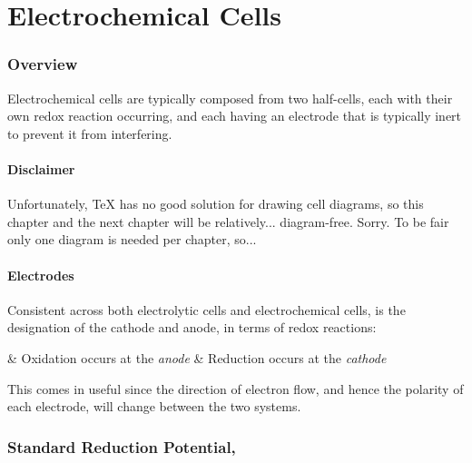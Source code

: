 

\pagebreak
\part{Electrochemical Cells}

	\section{Overview}

		Electrochemical cells are typically composed from two half-cells, each with their own redox reaction occurring, and each having an
		electrode that is typically inert to prevent it from interfering.

		\subsection{Disclaimer}

			Unfortunately, \TeX{} has no good solution for drawing cell diagrams, so this chapter and the next chapter will be relatively...
			diagram-free. Sorry. To be fair only one diagram is needed per chapter, so...



		\subsection{Electrodes}

			Consistent across both electrolytic cells and electrochemical cells, is the designation of the cathode and anode, in terms of
			redox reactions:

			\begin{bulletlist}
				& Oxidation occurs at the \textit{anode}
				& Reduction occurs at the \textit{cathode}
			\end{bulletlist}

			This comes in useful since the direction of electron flow, and hence the polarity of each electrode, will change between the two
			systems.




	\pagebreak
	\section{Standard Reduction Potential, \MEo{}}

